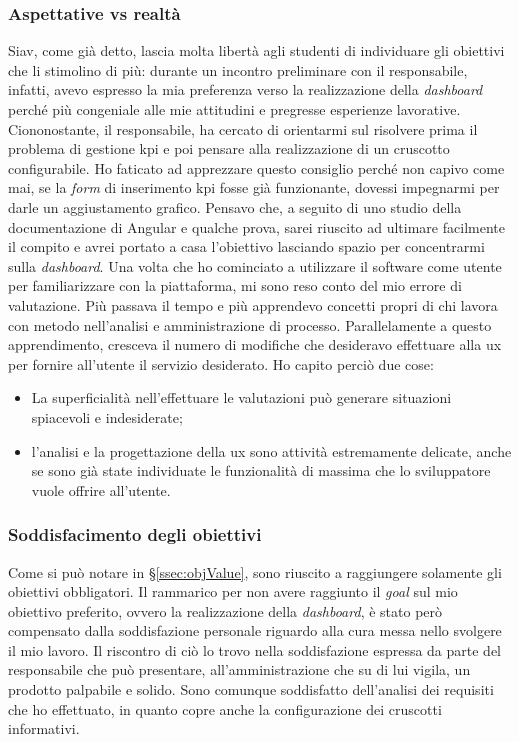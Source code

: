 \subsubsection{Aspettative vs realtà}
\label{ssec:aspettative}
 Siav, come già detto, lascia molta libertà agli studenti di individuare gli obiettivi che li stimolino di più: durante un incontro preliminare con il responsabile, infatti, avevo espresso la mia preferenza verso la realizzazione della \textit{dashboard} perché più congeniale alle mie attitudini e pregresse esperienze lavorative. Ciononostante, il responsabile, ha cercato di orientarmi sul risolvere prima il problema di gestione \acrshort{kpi} e poi pensare alla realizzazione di un cruscotto configurabile. Ho faticato ad apprezzare questo consiglio perché non capivo come mai, se la   \textit{form} di inserimento \acrshort{kpi} fosse già funzionante, dovessi impegnarmi per darle un aggiustamento grafico. Pensavo che, a seguito di uno studio della documentazione di Angular e qualche prova, sarei riuscito ad ultimare facilmente il compito e avrei portato a casa l'obiettivo lasciando spazio per concentrarmi sulla \textit{dashboard}. Una volta che ho cominciato a utilizzare il software come utente per familiarizzare con la piattaforma, mi sono reso conto del mio errore di valutazione. Più passava il tempo e più apprendevo concetti propri di chi lavora con metodo nell'analisi e amministrazione di processo. Parallelamente a questo apprendimento, cresceva il numero di modifiche che desideravo effettuare alla \acrshort{ux} per fornire all'utente il servizio desiderato. Ho capito perciò due cose:
\begin{itemize}
    \item La superficialità nell'effettuare le valutazioni può generare situazioni spiacevoli e indesiderate;
    \item l'analisi e la progettazione della \acrlong{ux} sono attività estremamente delicate, anche se sono già state individuate le funzionalità di massima che lo sviluppatore vuole offrire all'utente.
\end{itemize}
\newpage
\subsubsection{Soddisfacimento degli obiettivi}
Come si può notare in \S\ref{ssec:objValue}, sono riuscito a raggiungere solamente gli obiettivi obbligatori. Il rammarico per non avere raggiunto il \textit{goal} sul mio obiettivo preferito, ovvero la realizzazione della \textit{dashboard}, è stato però compensato dalla soddisfazione personale riguardo alla cura messa nello svolgere il mio lavoro. Il riscontro di ciò lo trovo nella soddisfazione espressa da parte del responsabile che può presentare, all'amministrazione che su di lui vigila, un prodotto palpabile e solido. Sono comunque soddisfatto dell'analisi dei requisiti che ho effettuato, in quanto copre anche la configurazione dei cruscotti informativi.
